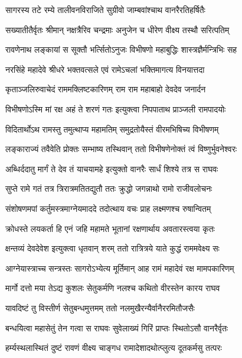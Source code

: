 \twolineshloka
{सागरस्य तटे रम्ये तालीवनविराजिते}
{सुग्रीवो जाम्बवांश्चाथ वानरैरतिहर्षितैः} %

\twolineshloka
{सख्यातीतैर्वृतः श्रीमान् नक्षत्रैरिव चन्द्रमाः}
{अनुजेन च धीरेण वीक्ष्य तस्थौ सरित्पतिम्} %

\twolineshloka
{रावणेनाथ लङ्कायां स सूक्तौ भर्त्सितोऽनुजः}
{विभीषणो महाबुद्धिः शास्त्रज्ञैर्मन्त्रिभिः सह} %

\twolineshloka
{नरसिंहे महादेवे श्रीधरे भक्तवत्सले}
{एवं रामेऽचलां भक्तिमागत्य विनयात्तदा} %

\twolineshloka
{कृताञ्जलिरुवाचेदं राममक्लिष्टकारिणम्}
{राम राम महाबाहो देवदेव जनार्दन} %

\twolineshloka
{विभीषणोऽस्मि मां रक्ष अहं ते शरणं गतः}
{इत्युक्त्वा निपपाताथ प्राञ्जली रामपादयोः} %

\twolineshloka
{विदितार्थोऽथ रामस्तु तमुत्थाप्य महामतिम्}
{समुद्रतोयैस्तं वीरमभिषिच्य विभीषणम्} %

\twolineshloka
{लङ्काराज्यं तवैवेति प्रोक्तः सम्भाष्य तस्थिवान्}
{ततो विभीषणेनोक्तं त्वं विष्णुर्भुवनेश्वरः} %

\twolineshloka
{अब्धिर्ददातु मार्गं ते देव तं याचयामहे}
{इत्युक्तो वानरैः सार्धं शिश्ये तत्र स राघवः} %

\twolineshloka
{सुप्ते रामे गतं तत्र त्रिरात्रमतितद्युतौ}
{ततः क्रुद्धो जगन्नाथो रामो राजीवलोचनः} %

\twolineshloka
{संशोषणमपां कर्तुमस्त्रमाग्नेयमाददे}
{तदोत्थाय वचः प्राह लक्ष्मणश्च रुषान्वितम्} %

\twolineshloka
{क्रोधस्ते लयकर्ता हि एनं जहि महामते}
{भूतानां रक्षणार्थाय अवतारस्त्वया कृतः} %

\twolineshloka
{क्षन्तव्यं देवदेवेश इत्युक्त्वा धृतवान् शरम्}
{ततो रात्रित्रये याते कुद्धं राममवेक्ष्य सः} %

\twolineshloka
{आग्नेयास्त्राच्च सन्त्रस्तः सागरोऽभ्येत्य मूर्तिमान्}
{आह रामं महादेवं रक्ष मामपकारिणम्} %

\twolineshloka
{मार्गो दत्तो मया तेऽद्य कुशलः सेतुकर्मणि}
{नलश्च कथितो वीरस्तेन कारय राघव} %

\twolineshloka
{यावदिष्टं तु विस्तीर्ण सेतुबन्धमुत्तमम्}
{ततो नलमुखैरन्यैर्वानैररमितौजसैः} %

\twolineshloka
{बन्धयित्वा महासेतुं तेन गत्वा स राघवः}
{सुवेलाख्यं गिरिं प्राप्तः स्थितोऽसौ वानरैर्वृतः} %

\twolineshloka
{हर्म्यस्थलास्थितं दुष्टं रावणं वीक्ष्य चाङ्गध}
{रामादेशादथोत्प्लुत्य दूतकर्मसु तत्परः} %

